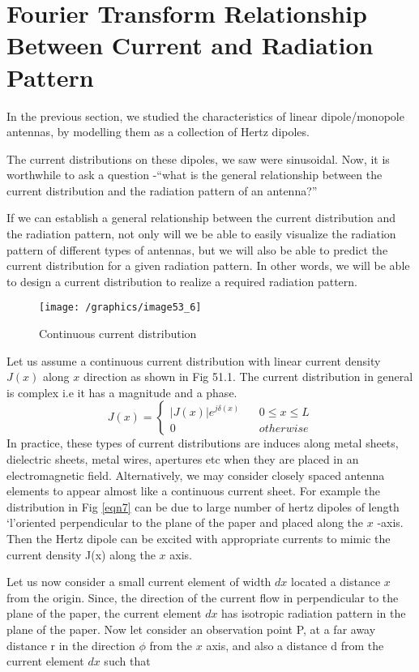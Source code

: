 \chapter{Fourier Transform Relationship Between Current and Radiation Pattern}
In the previous section, we studied the characteristics of linear dipole/monopole antennas, by modelling them as a collection of Hertz dipoles. 

The current distributions on these dipoles, we saw were sinusoidal. Now, it is worthwhile to ask a question -\textquotedblleft what is the general relationship between the current distribution and the radiation pattern of an antenna?\textquotedblright

If we can establish a general relationship between the current distribution and the radiation pattern, not only will we be able to easily visualize the radiation pattern of different types of antennas, but we will also be able to predict the current distribution for a given radiation pattern. In other words, we will be able to design a current distribution to realize a required radiation pattern.
\begin{figure}[h]
\centering
\texttt{[image: /graphics/image53\_6]}
\caption{Continuous current distribution}
\label{fig:fig6}
\end{figure}

Let us assume a continuous current distribution with linear current density $J(x)$ along $x$ direction as shown in Fig 51.1. The current distribution in general is complex i.e it has a magnitude and a phase.
\begin{equation}
J(x) =
\begin{cases}
|J(x)| e^{j\delta (x)} \ \ \ \ & 0\le x \le L \\
0  & otherwise
\end{cases}
\end{equation}
In practice, these types of current distributions are induces along metal sheets, dielectric sheets, metal wires, apertures etc when they are placed  in an electromagnetic field. Alternatively, we may consider closely spaced antenna elements to appear almost like a continuous current sheet. For example the distribution in Fig \ref{eqn7} can be due to large number of hertz dipoles of length \textquoteleft l\textquoteright oriented perpendicular to the plane of the paper and placed along the $x$ -axis. Then the Hertz dipole can be excited with appropriate currents to mimic the current density J(x) along the $x$ axis.

Let us now consider a small current element of width $dx$ located a distance $x$ from the origin. Since, the direction of the current flow in perpendicular to the plane of the paper, the current element $dx$ has isotropic radiation pattern in the plane of the paper. Now let consider an observation  point P, at a far away distance r in the direction $\phi$ from the $x$ axis, and also a distance d from the current element $dx$ such that

